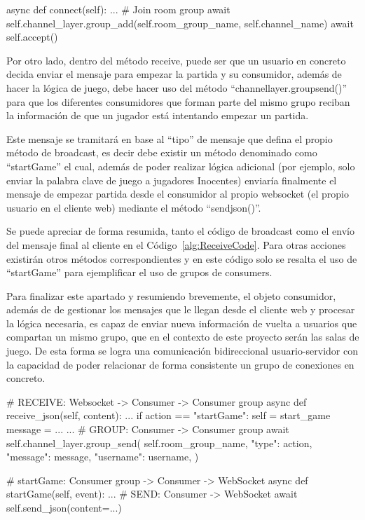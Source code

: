 \begin{mypython}[float={h},caption={Añadir consumer a un grupo},label={alg:JoinGroup}]
	async def connect(self):
		...
		# Join room group
		await self.channel_layer.group_add(self.room_group_name, self.channel_name)
		await self.accept()
									
\end{mypython}

Por otro lado, dentro del método receive, puede ser que un usuario en concreto decida enviar el mensaje para empezar la partida y su consumidor, además de hacer la lógica de juego, 
debe hacer uso del método ``channel\textunderscore layer.group\textunderscore send()'' para que los diferentes consumidores que forman parte del mismo grupo reciban la 
información de que un jugador está intentando empezar un partida. 

Este mensaje se tramitará en base al ``tipo'' de mensaje que defina el propio método de broadcast, es decir debe
existir un método denominado como ``startGame'' el cual, además de poder realizar lógica adicional (por ejemplo, solo enviar la palabra clave de juego a jugadores Inocentes) 
enviaría finalmente el mensaje de empezar partida desde el consumidor al propio websocket (el propio usuario en el cliente web) mediante el método ``send\textunderscore json()''. 

Se puede apreciar de forma resumida, tanto el código de broadcast como el envío del mensaje final al cliente en el Código~\ref{alg:ReceiveCode}. Para otras acciones existirán
otros métodos correspondientes y en este código solo se resalta el uso de ``startGame'' para ejemplificar el uso de grupos de consumers.

Para finalizar este apartado y resumiendo brevemente, el objeto consumidor, además de de gestionar los mensajes que le llegan desde el cliente web y procesar la lógica necesaria, 
es capaz de enviar nueva información de vuelta a usuarios que compartan un mismo grupo, que en el contexto de este proyecto serán las salas de juego. De esta forma se logra
una comunicación bidireccional usuario-servidor con la capacidad de poder relacionar de forma consistente un grupo de conexiones en concreto.

\begin{mypython}[float={h},caption={Broadcast a todos los consumidores y envío final al cliente},label={alg:ReceiveCode}]
						
	# RECEIVE: Websocket -> Consumer -> Consumer group
	async def receive_json(self, content):
		...	
		if action == "startGame":
		self = start_game
		message = {...}
		...	
		# GROUP: Consumer -> Consumer group
		await self.channel_layer.group_send(
		self.room_group_name,
		{"type": action, "message": message, "username": username},
		)
					
	# startGame: Consumer group -> Consumer -> WebSocket
	async def startGame(self, event):
		...
		# SEND: Consumer -> WebSocket
		await self.send_json(content={...})
									
\end{mypython}

